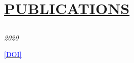 \documentclass[11pt]{article}
\begin{document}
\begin{itemize}[leftmargin=0em, noitemsep, nolistsep]
\begin{itemize}[noitemsep, nolistsep, leftmargin=0em]
        \end{itemize}

\end{itemize}
\vspace{20mm} %


%


\section*{\centering\underline{PUBLICATIONS}}
\subsection*{}
\noindent\textit{2020} \begin{NoHyper}\end{NoHyper} \href{https://doi.org/10.1109/JIOT.2020.2983278}{\textcolor{blue}{[DOI]}}
\end{document}

